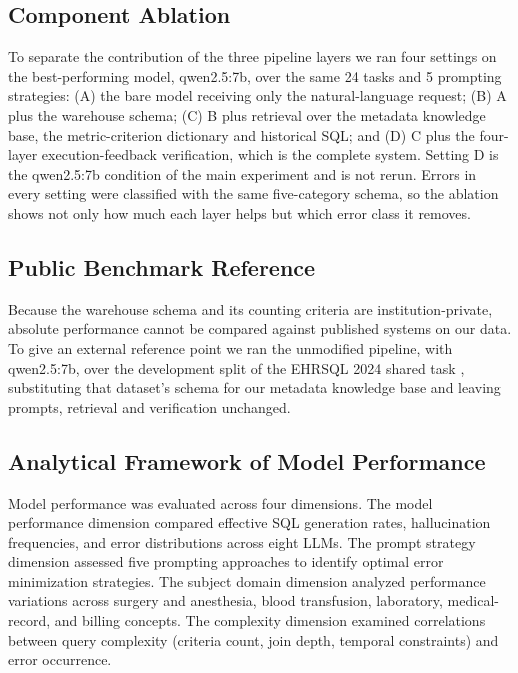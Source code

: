 \documentclass[applsci,article,submit,pdftex,oneauthor]{Definitions/mdpi}
\begin{document}
\subsection{Component Ablation}
To separate the contribution of the three pipeline layers we ran four settings
on the best-performing model, qwen2.5:7b, over the same 24 tasks and 5 prompting
strategies: (A) the bare model receiving only the natural-language request;
(B) A plus the warehouse schema; (C) B plus retrieval over the metadata knowledge
base, the metric-criterion dictionary and historical SQL; and (D) C plus the
four-layer execution-feedback verification, which is the complete system.
Setting D is the qwen2.5:7b condition of the main experiment and is not rerun.
Errors in every setting were classified with the same five-category schema, so
the ablation shows not only how much each layer helps but which error class it
removes.

\subsection{Public Benchmark Reference}
Because the warehouse schema and its counting criteria are institution-private,
absolute performance cannot be compared against published systems on our data.
To give an external reference point we ran the unmodified pipeline, with
qwen2.5:7b, over the development split of the EHRSQL 2024 shared task
\cite{ehrsql2024}, substituting that dataset's schema for our metadata knowledge
base and leaving prompts, retrieval and verification unchanged.

\subsection{Analytical Framework of Model Performance}
Model performance was evaluated across four dimensions. The model performance
dimension compared effective SQL generation rates, hallucination frequencies,
and error distributions across eight LLMs. The prompt strategy dimension
assessed five prompting approaches to identify optimal error minimization
strategies. The subject domain dimension analyzed performance variations across
surgery and anesthesia, blood transfusion, laboratory, medical-record, and
billing concepts. The complexity dimension examined correlations between query
complexity (criteria count, join depth, temporal constraints) and error
occurrence.
\end{document}

